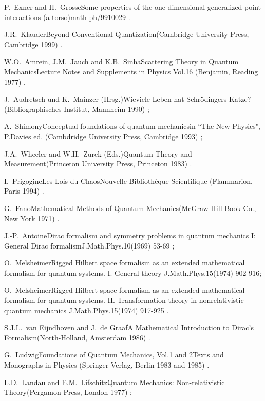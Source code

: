 \documentclass[12pt]{report}
\begin{document}
\begin{thebibliography}{22}
\bookref
{P.~Exner and H.~Grosse}{Some properties of the one-dimensional
generalized point interactions (a torso)}{math-ph/9910029 .}


\bookref
{J.R.~Klauder}{Beyond Conventional Quantization}{(Cambridge 
University Press, Cambridge 1999) .}

\bookref
{W.O.~Amrein, J.M.~Jauch and K.B.~Sinha}{Scattering Theory in
Quantum Mechanics}{Lecture Notes and Supplements in Physics Vol.16
(Benjamin, Reading 1977) .}

 
\bookref
{J.~Audretsch und K.~Mainzer (Hrsg.)}{Wieviele Leben hat Schr\"odingers
Katze?}{(Bibliographisches Institut, Mannheim 1990) ;}
 
\prepref
{A.~Shimony}{Conceptual foundations of quantum
mechanics}{in ``The New Physics", P.Davies ed. (Cambdridge
University Press, Cambridge 1993) ;}
 
\bookref
{J.A.~Wheeler and W.H.~Zurek (Eds.)}{Quantum Theory and
Measurement}{(Princeton University Press, Princeton 1983) .}

 
\bookref
{I.~Prigogine}{Les Lois du Chaos}{Nouvelle Biblioth\`eque
Scientifique (Flammarion, Paris 1994) .}

 
\bookref
{G.~Fano}{Mathematical Methods of Quantum Mechanics}{(McGraw-Hill
Book Co., New York 1971) .}

 
\artref
{J.-P.~Antoine}{Dirac formalism and symmetry problems in quantum
mechanics I: General
Dirac formalism}{J.Math.Phys.}{10}{(1969) 53-69 ;}
 
\artref
{O.~Melsheimer}{Rigged Hilbert space formalism as an extended
mathematical formalism for quantum systems. I. General theory}{
J.Math.Phys.}{15}{(1974) 902-916;}
 
\artref
{O.~Melsheimer}{Rigged Hilbert space formalism as an extended
mathematical formalism for quantum systems. II.
Transformation theory in nonrelativistic quantum mechanics}{
J.Math.Phys.}{15}{(1974) 917-925 .}


\bookref
{S.J.L.~van Eijndhoven and J.~de Graaf}{A Mathematical Introduction 
to Dirac's Formalism}{(North-Holland, Amsterdam 1986) .} 


\bookref
{G.~Ludwig}{Foundations of Quantum Mechanics, Vol.1 and 2}{Texts and
Monographs in Physics (Springer
Verlag, Berlin 1983 and 1985) .}
 
 
\bookref
{L.D.~Landau and E.M.~Lifschitz}{Quantum Mechanics: 
Non-relativistic Theo\-ry}{(Pergamon Press, London 1977) ;}
 

\end{thebibliography}
\end{document}
